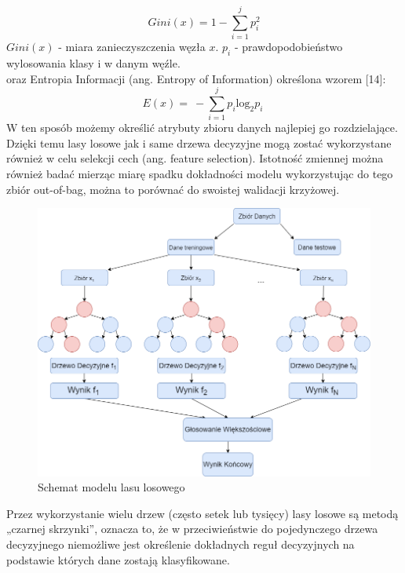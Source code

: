 \documentclass[a4paper,12pt,oneside]{book}
\begin{document}
\noindent
\begin{equation}
Gini\left(x\right)=1-\sum^j_{i=1}{p^2_i}
\end{equation}
$Gini(x)$ - miara zanieczyszczenia węzła $x$. \newline
\noindent $p_i$ - prawdopodobieństwo wylosowania klasy i w danym węźle.\\
oraz Entropia Informacji (ang. Entropy of Information) określona wzorem [14]:
\noindent
\begin{equation}
E\left(x\right)=\ -\sum^j_{i=1}{p_i{{\mathrm{log}}_2 p_i\ }}
\end{equation}
W ten sposób możemy określić atrybuty zbioru danych najlepiej go rozdzielające. Dzięki temu lasy losowe jak i same drzewa decyzyjne mogą zostać wykorzystane również w celu selekcji cech (ang. feature selection). Istotność zmiennej można również badać mierząc miarę spadku dokładności modelu wykorzystując do tego zbiór out-of-bag, można to porównać do swoistej walidacji krzyżowej.\\

\begin{figure}[h]
\centering
\includegraphics[scale=0.45]{RandForest.png}
\caption{Schemat modelu lasu losowego }
\end{figure}

Przez wykorzystanie wielu drzew (często setek lub tysięcy) lasy losowe są metodą „czarnej skrzynki”, oznacza to, że w przeciwieństwie do pojedynczego drzewa decyzyjnego niemożliwe jest  określenie dokładnych reguł decyzyjnych na podstawie których dane zostają klasyfikowane.
\end{document}
